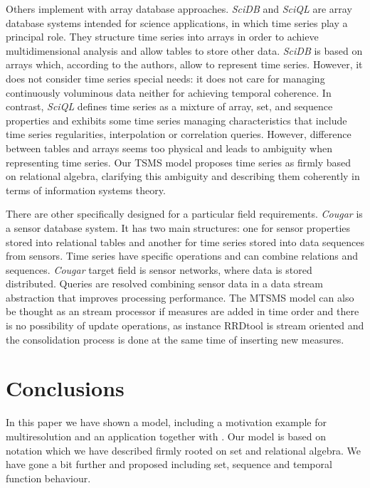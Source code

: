  
Others implement  with array database approaches.
\emph{SciDB} \cite{stonebraker09:scidb} and \emph{SciQL}
\cite{zhang11} are array database systems intended for science
applications, in which time series play a principal role. They
structure time series into arrays in order to achieve multidimensional
analysis and allow tables to store other data.  \emph{SciDB} is based
on arrays which, according to the authors, allow to represent time
series. However, it does not consider time series special needs: it
does not care for managing continuously voluminous data neither for
achieving temporal coherence.  In contrast, \emph{SciQL} defines time
series as a mixture of array, set, and sequence properties and
exhibits some time series managing characteristics that include time
series regularities, interpolation or correlation queries.  However,
difference between tables and arrays seems too physical and leads to
ambiguity when representing time series.  Our TSMS model proposes time
series as firmly based on relational algebra, clarifying this
ambiguity and describing them coherently in terms of information
systems theory.




There are other  specifically designed for a particular
field requirements.  \emph{Cougar} \cite{bonnet01} is a sensor
database system. It has two main structures: one for sensor properties
stored into relational tables and another for time series stored into
data sequences from sensors. Time series have specific operations and
can combine relations and sequences. \emph{Cougar} target field is
sensor networks, where data is stored distributed. Queries are
resolved combining sensor data in a data stream abstraction that
improves processing performance.  The MTSMS model can also be thought
as an stream processor if measures are added in time order and there
is no possibility of update operations, as instance RRDtool is stream
oriented and the consolidation process is done at the same time of
inserting new measures.





\section{Conclusions}
\label{sec:concl-future-work}


In this paper we have shown a  model, including a
motivation example for multiresolution and an application together
with . Our  model is based on 
notation which we have described firmly rooted on set and relational
algebra. We have gone a bit further and proposed  including
set, sequence and temporal function behaviour.



